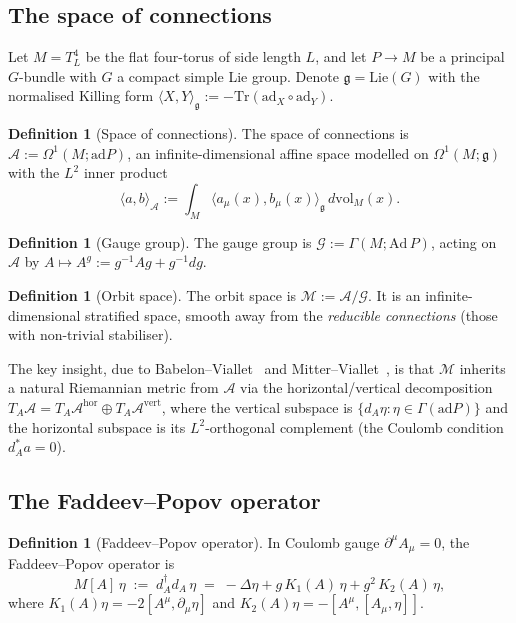 \documentclass[11pt,a4paper]{amsart}
\theoremstyle{definition}
\newtheorem{definition}[theorem]{Definition}
\theoremstyle{remark}
\newcommand{\calA}{\mathcal{A}}
\newcommand{\calG}{\mathcal{G}}
\newcommand{\calM}{\mathcal{M}}
\newcommand{\gfrak}{\mathfrak{g}}
\newcommand{\inner}[2]{\langle #1, #2\rangle}
\newcommand{\Tr}{\mathrm{Tr}}
\newcommand{\ad}{\mathrm{ad}}
\newcommand{\dvol}{\,d\mathrm{vol}}
\begin{document}
\subsection{The space of connections}

Let $M = T^4_L$ be the flat four-torus of side length $L$, and let
$P \to M$ be a principal $G$-bundle with $G$ a compact simple Lie group.
Denote $\gfrak = \mathrm{Lie}(G)$ with the normalised Killing form
$\inner{X}{Y}_\gfrak := -\Tr(\ad_X \circ \ad_Y)$.

\begin{definition}[Space of connections]
The space of connections is
$\calA := \Omega^1(M; \ad P)$,
an infinite-dimensional affine space modelled on
$\Omega^1(M; \gfrak)$ with the $L^2$ inner product
\[
\inner{a}{b}_\calA := \int_M \inner{a_\mu(x)}{b_\mu(x)}_\gfrak \dvol_M(x).
\]
\end{definition}

\begin{definition}[Gauge group]
The gauge group is
$\calG := \Gamma(M; \mathrm{Ad}\,P)$,
acting on $\calA$ by
$A \mapsto A^g := g^{-1} A g + g^{-1} dg$.
\end{definition}

\begin{definition}[Orbit space]
The orbit space is
$\calM := \calA / \calG$.
It is an infinite-dimensional stratified space, smooth away from the
\emph{reducible connections} (those with non-trivial stabiliser).
\end{definition}

The key insight, due to Babelon--Viallet~\cite{BabelonViallet1981} and
Mitter--Viallet~\cite{MitterViallet1981}, is that $\calM$ inherits a
natural Riemannian metric from $\calA$ via the horizontal/vertical
decomposition $T_A \calA = T_A \calA^{\mathrm{hor}} \oplus T_A \calA^{\mathrm{vert}}$,
where the vertical subspace is $\{d_A \eta : \eta \in \Gamma(\ad P)\}$ and
the horizontal subspace is its $L^2$-orthogonal complement (the Coulomb
condition $d_A^* a = 0$).

\subsection{The Faddeev--Popov operator}\label{ssec:FP}

\begin{definition}[Faddeev--Popov operator]
In Coulomb gauge $\partial^\mu A_\mu = 0$, the Faddeev--Popov operator is
\begin{equation}\label{eq:FP}
M[A]\,\eta \;:=\; d_A^\dagger d_A\,\eta
\;=\; -\Delta \eta + g\,K_1(A)\,\eta + g^2\,K_2(A)\,\eta,
\end{equation}
where
$K_1(A)\eta = -2[A^\mu, \partial_\mu \eta]$
and
$K_2(A)\eta = -[A^\mu, [A_\mu, \eta]]$.
\end{definition}
\end{document}
